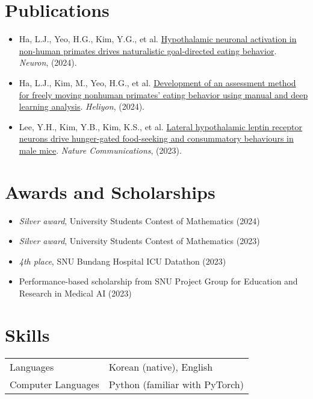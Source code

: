 \documentclass[11pt, a4paper]{article}
\newenvironment{customitemize}
	{\begin{itemize}[leftmargin=*, noitemsep, topsep=0pt, label=$\cdot$]}
	{\end{itemize}}
\begin{document}
\section*{Publications}
\begin{customitemize}
    \item Ha, L.J., Yeo, H.G., Kim, Y.G., et al. \href{https://doi.org/10.1016/j.neuron.2024.03.029}{Hypothalamic neuronal activation in non-human primates drives naturalistic goal-directed eating behavior}. {\it Neuron}, (2024). 
    \item Ha, L.J., Kim, M., Yeo, H.G., et al. \href{https://doi.org/10.1016/j.heliyon.2024.e25561}{Development of an assessment method for freely moving nonhuman primates' eating behavior using manual and deep learning analysis}. {\it Heliyon}, (2024). 
    \item Lee, Y.H., Kim, Y.B., Kim, K.S., et al. \href{https://doi.org/10.1038/s41467-023-37044-4}{Lateral hypothalamic leptin receptor neurons drive hunger-gated food-seeking and consummatory behaviours in male mice}. {\it Nature Communications}, (2023). 
\end{customitemize}


\section*{Awards and Scholarships}
\begin{customitemize}
    \item \textit{Silver award}, University Students Contest of Mathematics (2024)
    \item \textit{Silver award}, University Students Contest of Mathematics (2023)
    \item \textit{4th place}, SNU Bundang Hospital ICU Datathon (2023)
    \item Performance-based scholarship from SNU Project Group for Education and Research in Medical AI (2023)
\end{customitemize}


\section*{Skills}
\begin{tabular}{ll}
    Languages & Korean (native), English \\
    Computer Languages & Python (familiar with PyTorch)
\end{tabular}
\end{document}
